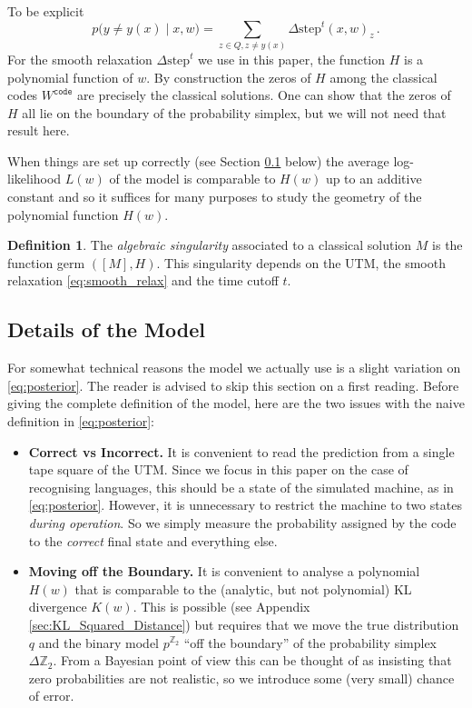 \documentclass[english,letter paper,12pt,reqno]{article}
\theoremstyle{definition}
\newtheorem{definition}[theorem]{Definition}
\def\be{\begin{equation}}
\def\ee{\end{equation}}
\newcommand{\bb}[1]{\mathbb{#1}}
\begin{document}
To be explicit
\be\label{eq:model_from_stept}
p\big( y \neq y(x) \mid x, w\big) = \sum_{z \in Q, z \neq y(x)} \Delta\textrm{step}^t(x,w)_{z}\,.
\ee
For the smooth relaxation $\Delta \textrm{step}^t$ we use in this paper, the function $H$ is a polynomial function of $w$. By construction the zeros of $H$ among the classical codes $W^{\texttt{code}}$ are precisely the classical solutions. One can show \cite[Lemma B.2]{clift2021geometry} that the zeros of $H$ all lie on the boundary of the probability simplex, but we will not need that result here.

When things are set up correctly (see Section \ref{section:details_model} below) the average log-likelihood $L(w)$ of the model is comparable to $H(w)$ up to an additive constant and so it suffices for many purposes to study the geometry of the polynomial function $H(w)$.

\begin{definition} The \emph{algebraic singularity} associated to a classical solution $M$ is the function germ $([M], H)$. This singularity depends on the UTM, the smooth relaxation \eqref{eq:smooth_relax} and the time cutoff $t$.
\end{definition}

\subsection{Details of the Model}\label{section:details_model}

For somewhat technical reasons the model we actually use is a slight variation on \eqref{eq:posterior}. The reader is advised to skip this section on a first reading. Before giving the complete definition of the model, here are the two issues with the naive definition in \eqref{eq:posterior}:

\begin{itemize}
    \item \textbf{Correct vs Incorrect.} It is convenient to read the prediction from a single tape square of the UTM. Since we focus in this paper on the case of recognising languages, this should be a state of the simulated machine, as in \eqref{eq:posterior}. However, it is unnecessary to restrict the machine to two states \emph{during operation}. So we simply measure the probability assigned by the code to the \emph{correct} final state and everything else.
    \item \textbf{Moving off the Boundary.} It is convenient to analyse a polynomial $H(w)$ that is comparable to the (analytic, but not polynomial) KL divergence $K(w)$. This is possible (see Appendix \ref{sec:KL_Squared_Distance}) but requires that we move the true distribution $q$ and the binary model $p^{\bb{Z}_2}$ ``off the boundary'' of the probability simplex $\Delta \bb{Z}_2$. From a Bayesian point of view this can be thought of as insisting that zero probabilities are not realistic, so we introduce some (very small) chance of error.
\end{itemize}
\end{document}
